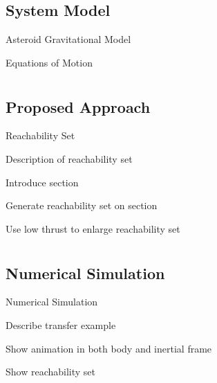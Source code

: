 \documentclass[11pt,professionalfonts]{beamer}
\begin{document}
\subsection*{System Model}

\begin{frame}{Asteroid Gravitational Model}

\end{frame}

\begin{frame}{Equations of Motion}

\end{frame}

\section*{}
\subsection*{Proposed Approach}

\begin{frame}{Reachability Set} %

Description of reachability set

Introduce \Poincare section

Generate reachability set on \Poincare section

Use low thrust to enlarge reachability set
\end{frame} %

\section*{}
\subsection*{Numerical Simulation}

\begin{frame}{Numerical Simulation} %

Describe transfer example

Show animation in both body and inertial frame

Show reachability set


\end{frame}%
\end{document}
